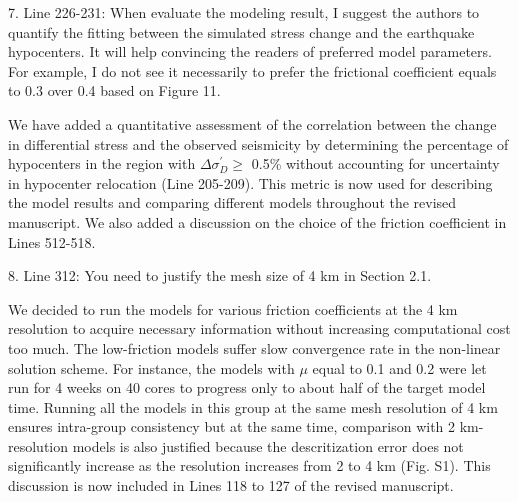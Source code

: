 \documentclass[12pt]{article}
\begin{document}
\begin{response}{7. Line 226-231: When evaluate the modeling result, I suggest the authors to quantify the fitting between the simulated stress change and the earthquake hypocenters. It will help convincing the readers of preferred model parameters. For example, I do not see it necessarily to prefer the frictional coefficient equals to 0.3 over 0.4 based on Figure 11.}

   We have added a quantitative assessment of the correlation between the change in differential stress and the observed seismicity by determining the percentage of hypocenters in the region with $\Delta\sigma_{D}^\prime \ge$ 0.5\% without accounting for uncertainty in hypocenter relocation (Line 205-209). This metric is now used for describing the model results and comparing different models throughout the revised manuscript. We also added a discussion on the choice of the friction coefficient in Lines 512-518.
\end{response}

\begin{response}{8. Line 312: You need to justify the mesh size of 4 km in Section 2.1.}

We decided to run the models for various friction coefficients at the 4 km resolution to acquire necessary information without increasing computational cost too much. The low-friction models suffer slow convergence rate in the non-linear solution scheme. For instance, the models with $\mu$ equal to 0.1 and 0.2 were let run for 4 weeks on 40 cores to progress only to about half of the target model time. Running all the models in this group at the same mesh resolution of 4 km ensures intra-group consistency but at the same time, comparison with 2 km-resolution models is also justified because the descritization error does not significantly increase as the resolution increases from 2 to 4 km (Fig. S1). This discussion is now included in Lines 118 to 127 of the revised manuscript.
\end{response}
\end{document}
